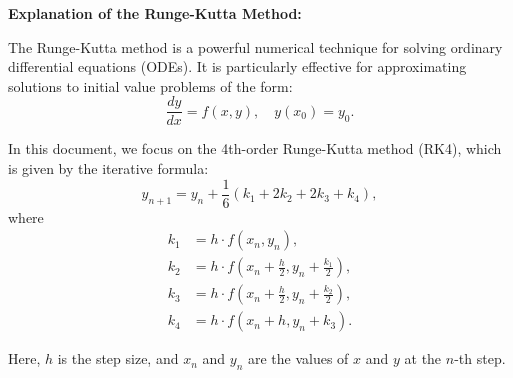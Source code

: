\documentclass[journal]{IEEEtran}
\begin{document}
\textbf{Explanation of the Runge-Kutta Method:}

    The Runge-Kutta method is a powerful numerical technique for solving ordinary differential equations (ODEs). It is particularly effective for approximating solutions to initial value problems of the form:
    \[ \frac{dy}{dx} = f(x, y), \quad y(x_0) = y_0. \]

    In this document, we focus on the 4th-order Runge-Kutta method (RK4), which is given by the iterative formula:
    \[ y_{n+1} = y_n + \frac{1}{6}(k_1 + 2k_2 + 2k_3 + k_4), \]
    where
    \begin{align*}
        k_1 &= h \cdot f(x_n, y_n), \\
        k_2 &= h \cdot f\left(x_n + \frac{h}{2}, y_n + \frac{k_1}{2}\right), \\
        k_3 &= h \cdot f\left(x_n + \frac{h}{2}, y_n + \frac{k_2}{2}\right), \\
        k_4 &= h \cdot f(x_n + h, y_n + k_3).
    \end{align*}

    Here, \( h \) is the step size, and \( x_n \) and \( y_n \) are the values of \( x \) and \( y \) at the \( n \)-th step.
\end{document}
